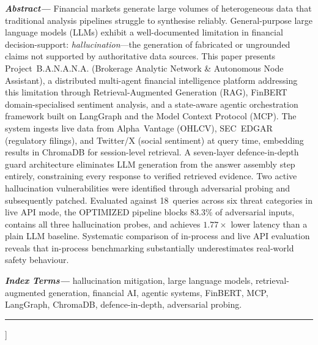 \documentclass[10pt,twocolumn]{article}
\newcommand{\banana}{\mbox{B.A.N.A.N.A.}}
\begin{document}
{\begin{@twocolumnfalse}
\begin{center}
  \begin{minipage}{0.9\linewidth}
    \small\textit{\textbf{Abstract---}}%
    Financial markets generate large volumes of heterogeneous data that
    traditional analysis pipelines struggle to synthesise reliably.
    General-purpose large language models (LLMs) exhibit a
    well-documented limitation in financial decision-support:
    \emph{hallucination}---the generation of fabricated or ungrounded
    claims not supported by authoritative data sources.
    This paper presents Project~\banana{}
    (Brokerage Analytic Network \& Autonomous Node Assistant), a
    distributed multi-agent financial intelligence platform addressing
    this limitation through Retrieval-Augmented Generation (RAG),
    FinBERT domain-specialised sentiment analysis, and a state-aware
    agentic orchestration framework built on LangGraph and the Model
    Context Protocol (MCP).
    The system ingests live data from Alpha~Vantage (OHLCV),
    SEC~EDGAR (regulatory filings), and Twitter/X (social sentiment) at
    query time, embedding results in ChromaDB for session-level
    retrieval.
    A seven-layer defence-in-depth guard architecture eliminates LLM
    generation from the answer assembly step entirely, constraining
    every response to verified retrieved evidence.
    Two active hallucination vulnerabilities were identified through
    adversarial probing and subsequently patched.
    Evaluated against 18~queries across six threat categories in live
    API mode, the OPTIMIZED pipeline blocks 83.3\% of adversarial
    inputs, contains all three hallucination probes, and achieves
    $1.77\times$ lower latency than a plain LLM baseline.
    Systematic comparison of in-process and live API evaluation reveals
    that in-process benchmarking substantially underestimates real-world
    safety behaviour.
  \end{minipage}

  \vspace{6pt}
  \begin{minipage}{0.9\linewidth}
    \small\textit{\textbf{Index Terms---}}%
    hallucination mitigation, large language models,
    retrieval-augmented generation, financial AI, agentic systems,
    FinBERT, MCP, LangGraph, ChromaDB, defence-in-depth,
    adversarial probing.
  \end{minipage}

  \vspace{10pt}
  \rule{\linewidth}{0.4pt}
  \vspace{10pt}
\end{center}
\end{@twocolumnfalse}
}]
\end{document}
